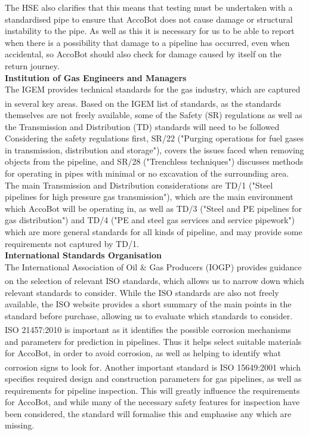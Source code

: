 \documentclass[11pt]{article}		%
\newcommand{\supercite}[1]{\textsuperscript{\cite{#1}}}		%
\begin{document}
			The HSE also clarifies that this means that testing must be undertaken with a standardised pipe to ensure that AccoBot does not cause damage or structural instability to the pipe.
			As well as this it is necessary for us to be able to report when there is a possibility that damage to a pipeline has occurred, even when accidental, so AccoBot should also check for damage caused by itself on the return journey.
			\\
			\textbf{Institution of Gas Engineers and Managers}
			\\
			The IGEM provides technical standards for the gas industry, which are captured in several key areas.
			Based on the IGEM list of standards\supercite{institution2021igem}, as the standards themselves are not freely available, some of the Safety (SR) regulations  as well as the Transmission and Distribution (TD) standards will need to be followed
			Considering the safety regulations first, SR/22 ("Purging operations for fuel gases in transmission, distribution and storage"), covers the issues faced when removing objects from the pipeline, and SR/28 ("Trenchless techniques") discusses methods for operating in pipes with minimal or no excavation of the surrounding area.
			The main Transmission and Distribution considerations are TD/1 ("Steel pipelines for high pressure gas transmission"), which are the main environment which AccoBot will be operating in, as well as TD/3 ("Steel and PE pipelines for gas distribution") and TD/4 ("PE and steel gas services and service pipework") which are more general standards for all kinds of pipeline, and may provide some requirements not captured by TD/1.
			\\
			\textbf{International Standards Organisation}
			\\
			The International Association of Oil \& Gas Producers (IOGP) provides guidance on the selection of relevant ISO standards\supercite{iogp2017standards}, which allows us to narrow down which relevant standards to consider.
			While the ISO standards are also not freely available, the ISO website provides a short summary of the main points in the standard before purchase, allowing us to evaluate which standards to consider.
			ISO 21457:2010\supercite{iso21457} is important as it identifies the possible corrosion mechanisms and parameters for prediction in pipelines.
			Thus it helps select suitable materials for AccoBot, in order to avoid corrosion, as well as helping to identify what corrosion signs to look for.
			Another important standard is ISO 15649:2001\supercite{iso15649} which specifies required design and construction parameters for gas pipelines, as well as requirements for pipeline inspection.
			This will greatly influence the requirements for AccoBot, and while many of the necessary safety features for inspection have been considered, the standard will formalise this and emphasise any which are missing.
		
\end{document}
